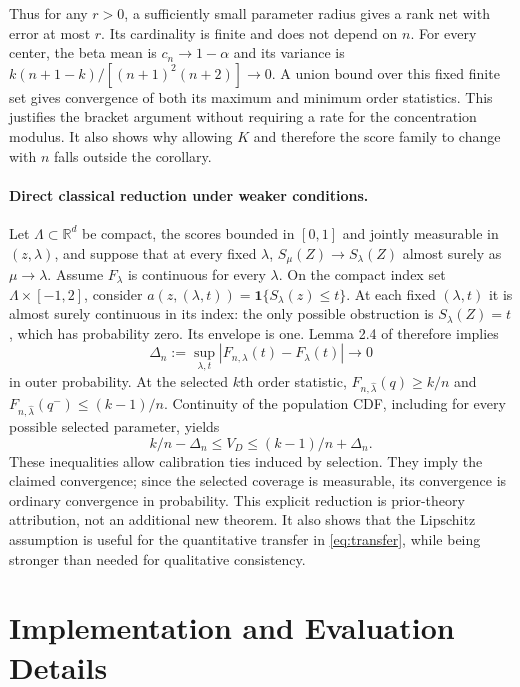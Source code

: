 \documentclass{article}
\newcommand{\ind}{\mathbf 1}
\newcommand{\R}{\mathbb R}
\begin{document}
Thus for any $r>0$, a sufficiently small parameter radius gives a rank net with error at most $r$. Its cardinality is finite and does not depend on $n$. For every center, the beta mean is $c_n\to1-\alpha$ and its variance is $k(n+1-k)/[(n+1)^2(n+2)]\to0$. A union bound over this fixed finite set gives convergence of both its maximum and minimum order statistics. This justifies the bracket argument without requiring a rate for the concentration modulus. It also shows why allowing $K$ and therefore the score family to change with $n$ falls outside the corollary.

\paragraph{Direct classical reduction under weaker conditions.}
Let $\Lambda\subset\R^d$ be compact, the scores bounded in $[0,1]$ and jointly measurable in $(z,\lambda)$, and suppose that at every fixed $\lambda$, $S_\mu(Z)\to S_\lambda(Z)$ almost surely as $\mu\to\lambda$. Assume $F_\lambda$ is continuous for every $\lambda$. On the compact index set $\Lambda\times[-1,2]$, consider $a(z,(\lambda,t))=\ind\{S_\lambda(z)\le t\}$. At each fixed $(\lambda,t)$ it is almost surely continuous in its index: the only possible obstruction is $S_\lambda(Z)=t$, which has probability zero. Its envelope is one. Lemma 2.4 of \citet{newey1994} therefore implies
\begin{equation}
 \Delta_n:=\sup_{\lambda,t}|F_{n,\lambda}(t)-F_\lambda(t)|\longrightarrow0
\end{equation}
in outer probability. At the selected $k$th order statistic, $F_{n,\hat\lambda}(q)\ge k/n$ and $F_{n,\hat\lambda}(q^-)\le(k-1)/n$. Continuity of the population CDF, including for every possible selected parameter, yields
\begin{equation}
 k/n-\Delta_n\le V_D\le(k-1)/n+\Delta_n.
\end{equation}
These inequalities allow calibration ties induced by selection. They imply the claimed convergence; since the selected coverage is measurable, its convergence is ordinary convergence in probability. This explicit reduction is prior-theory attribution, not an additional new theorem. It also shows that the Lipschitz assumption is useful for the quantitative transfer in \cref{eq:transfer}, while being stronger than needed for qualitative consistency.

\section{Implementation and Evaluation Details}\label{app:implementation}
\end{document}
